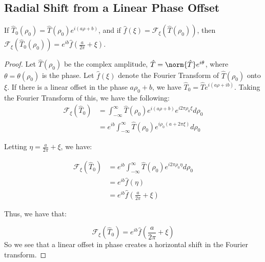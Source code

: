 \documentclass[crop=false,class=book,oneside]{standalone}
\begin{document}
        \subsection{Radial Shift from a Linear Phase Offset}
            \begin{theorem}
            If $\hat{T}_0(\rho_0) = \hat{T}(\rho_0)e^{i(a\rho+b)}$, and if $\hat{f}(\xi) = \mathcal{F}_{\xi}(\hat{T}(\rho_0))$, then $\mathcal{F}_{\xi}(\hat{T}_{0}(\rho_0)) = e^{ib}\hat{f}(\frac{a}{2\pi}+\xi)$.
            \end{theorem}
            \begin{proof}
            Let $\hat{T}(\rho_0)$ be the complex amplitude, $\hat{T} = \norm{\hat{T}}e^{i\theta}$, where $\theta = \theta(\rho_0)$ is the phase. Let $\hat{f}(\xi)$ denote the Fourier Transform of $\hat{T}(\rho_0)$ onto $\xi$. If there is a linear offset in the phase $a\rho_0+b$, we have $\hat{T}_{0} = \hat{T}e^{i(a\rho+ib)}$. Taking the Fourier Transform of this, we have the following:
            \begin{align*}
            \nonumber \mathcal{F}_{\xi} (\hat{T}_{0})&= \int_{-\infty}^{\infty}\hat{T}(\rho_0)e^{i(a\rho+b)}e^{i2\pi \rho_0 \xi}d\rho_0\\
            &=e^{ib} \int_{-\infty}^{\infty} \hat{T}(\rho_0)e^{i\rho_0(a+2\pi \xi)}d\rho_0
            \end{align*}
            
            Letting $\eta = \frac{a}{2\pi}+\xi$, we have:
            
            \begin{align*}
            \nonumber \mathcal{F}_{\xi} (\hat{T}_{0}) &= e^{ib}\int_{-\infty}^{\infty}\hat{T}(\rho_0)e^{i2\pi\rho_{0}\eta}d\rho_0 \\
            \nonumber &= e^{ib}\hat{f}(\eta)\\
            		 &= e^{ib}\hat{f}(\frac{a}{2\pi}+\xi)
            \end{align*}
            
            Thus, we have that:
            
            \begin{equation*}
            \mathcal{F}_{\xi} (\hat{T}_{0}) = e^{ib}\hat{f}(\frac{a}{2\pi}+\xi)
            \end{equation*}
            So we see that a linear offset in phase creates a horizontal shift in the Fourier transform.
            \end{proof}
            
\end{document}
